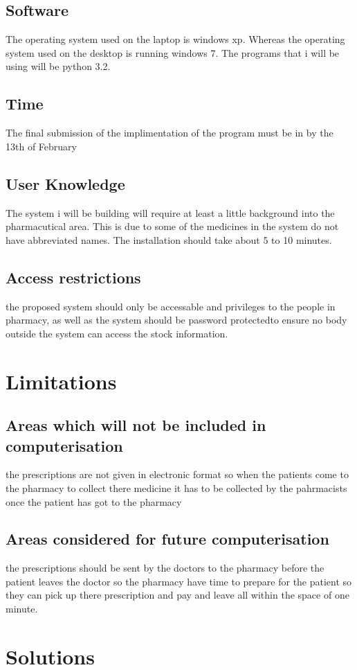 \subsection{Software}
The operating system used on the laptop is windows xp.
Whereas the operating system used on the desktop is running windows 7.
The programs that i will be using will be python 3.2.
\subsection{Time}
The final submission of the implimentation of the program must be in by the 13th of February 
\subsection{User Knowledge}
The system i will be building will require at least a little background into the pharmacutical area. This is due to some of the medicines in the system do not have abbreviated names. The installation should take about 5 to 10 minutes. 
\subsection{Access restrictions}
the proposed system should only be accessable and privileges to the people in pharmacy, as well as the system should be password protectedto ensure no body outside the system can access the stock information.
\space

\section{Limitations}
\subsection{Areas which will not be included in computerisation}
the prescriptions are not given in electronic format so when the patients come to the pharmacy to collect there medicine it has to be collected by the pahrmacists once the patient has got to the pharmacy
\subsection{Areas considered for future computerisation}
the prescriptions should be sent by the doctors to the pharmacy before the patient leaves the doctor so the pharmacy have time to prepare for the patient so they can pick up there prescription and pay and leave all within the space of one minute.
\pagebreak
\section{Solutions}
